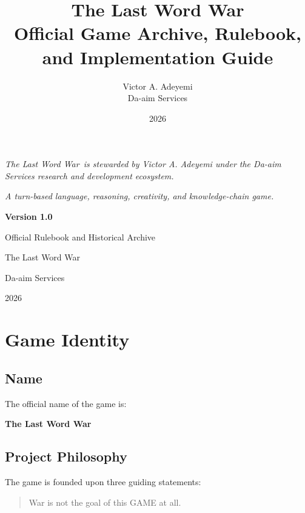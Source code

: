 \documentclass[11pt,a4paper]{article}
\title{\textbf{The Last Word War\texttrademark}\\
\large Official Game Archive, Rulebook, and Implementation Guide}
\author{
Victor A. Adeyemi\\
Da-aim Services
}
\date{2026}
\begin{document}
\maketitle

\begin{center}
\textit{
The Last Word War\texttrademark\ is stewarded by
Victor A. Adeyemi under the
Da-aim Services research and development ecosystem.
}
\end{center}

\vspace{1em}

\begin{center}
\textit{A turn-based language, reasoning, creativity, and knowledge-chain game.}
\end{center}

\begin{center}
\textbf{Version 1.0}

Official Rulebook and Historical Archive

The Last Word War\texttrademark

Da-aim Services

2026
\end{center}

\vspace{1em}

\tableofcontents


\newpage

\section{Game Identity}

\subsection{Name}

The official name of the game is:

\begin{center}
\textbf{The Last Word War\texttrademark}
\end{center}

\subsection{Project Philosophy}

The game is founded upon three guiding statements:

\begin{quote}
War is not the goal of this GAME at all.
\end{quote}
\end{document}
